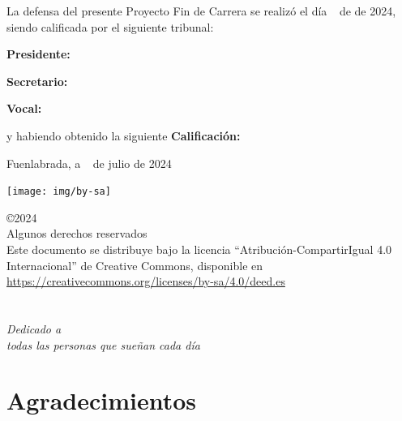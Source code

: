\documentclass[a4paper, 12pt]{book}
\makeatletter
\let\theauthor\@author
\makeatother
\begin{document}
\vspace{0.8cm}
La defensa del presente Proyecto Fin de Carrera se realizó el día \qquad$\;\,$ de \qquad\qquad\qquad\qquad \newline de 2024, siendo calificada por el siguiente tribunal:


\vspace{0.5cm}
\textbf{Presidente:}

\vspace{1cm}
\textbf{Secretario:}

\vspace{1cm}
\textbf{Vocal:}


\vspace{1cm}
y habiendo obtenido la siguiente \textbf{Calificación:}


\vspace{1cm}
\begin{flushright}
Fuenlabrada, a \qquad$\;\,$ de julio de 2024
\end{flushright}

\vspace{1cm}

\texttt{[image: img/by-sa]}

\noindent©2024 \theauthor  \\
Algunos derechos reservados  \\
Este documento se distribuye bajo la licencia ``Atribución-CompartirIgual 4.0 Internacional'' de Creative Commons, disponible en \\
\url{https://creativecommons.org/licenses/by-sa/4.0/deed.es}



\chapter*{}
\begin{flushright}
\textit{Dedicado a \\
todas las personas que sueñan cada día}
\end{flushright}


\chapter*{Agradecimientos}
\end{document}
